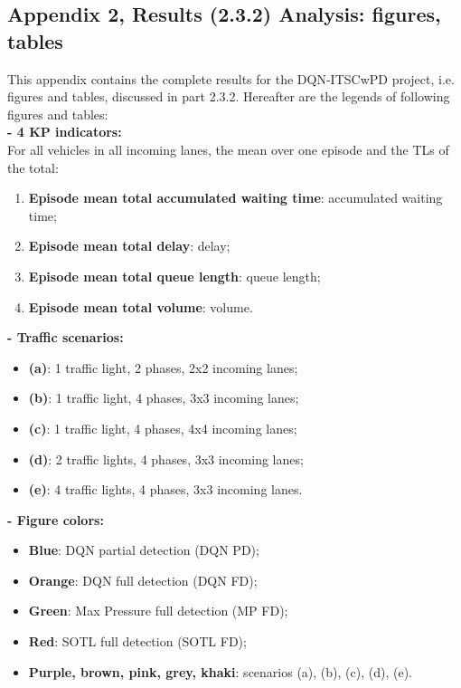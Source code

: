 \restoregeometry

\pagebreak

\subsection*{Appendix 2, Results (2.3.2) Analysis: figures, tables}

This appendix contains the complete results for the DQN-ITSCwPD project, i.e. figures and tables, discussed in part 2.3.2.
Hereafter are the legends of following figures and tables: \\

\textbf{- 4 KP indicators:} \\
For all vehicles in all incoming lanes, the mean over one episode and the TLs of the total: 
\begin{enumerate}
    \setlength\itemsep{-0.5em}
    \item \textbf{Episode mean total accumulated waiting time}: accumulated waiting time;
    \item \textbf{Episode mean total delay}: delay;
    \item \textbf{Episode mean total queue length}: queue length;
    \item \textbf{Episode mean total volume}: volume.
\end{enumerate}

\textbf{- Traffic scenarios:} 
\begin{itemize}
    \setlength\itemsep{-0.5em}
    \item \textbf{(a)}: 1 traffic light, 2 phases, 2x2 incoming lanes;
    \item \textbf{(b)}: 1 traffic light, 4 phases, 3x3 incoming lanes;
    \item \textbf{(c)}: 1 traffic light, 4 phases, 4x4 incoming lanes;
    \item \textbf{(d)}: 2 traffic lights, 4 phases, 3x3 incoming lanes;
    \item \textbf{(e)}: 4 traffic lights, 4 phases, 3x3 incoming lanes.
\end{itemize}

\textbf{- Figure colors:}
\begin{itemize}
    \setlength\itemsep{-0.5em}
    \item \textbf{Blue}: DQN partial detection (DQN PD);
    \item \textbf{Orange}: DQN full detection (DQN FD);
    \item \textbf{Green}: Max Pressure full detection (MP FD);
    \item \textbf{Red}: SOTL full detection (SOTL FD);
    \item \textbf{Purple, brown, pink, grey, khaki}: scenarios (a), (b), (c), (d), (e).
\end{itemize}

